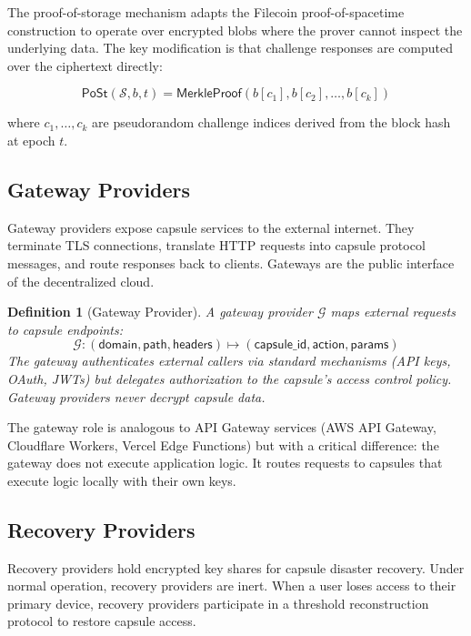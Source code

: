 \documentclass[11pt,a4paper]{article}
\newtheorem{definition}{Definition}
\begin{document}
The proof-of-storage mechanism adapts the Filecoin proof-of-spacetime
construction \cite{benet2017filecoin} to operate over encrypted blobs where
the prover cannot inspect the underlying data. The key modification is that
challenge responses are computed over the ciphertext directly:

\begin{equation}
    \mathsf{PoSt}(\mathcal{S}, b, t) = \mathsf{MerkleProof}(b[c_1], b[c_2], \ldots, b[c_k])
\end{equation}

where $c_1, \ldots, c_k$ are pseudorandom challenge indices derived from the
block hash at epoch $t$.

\subsection{Gateway Providers}

Gateway providers expose capsule services to the external internet. They
terminate TLS connections, translate HTTP requests into capsule protocol
messages, and route responses back to clients. Gateways are the public
interface of the decentralized cloud.

\begin{definition}[Gateway Provider]
A gateway provider $\mathcal{G}$ maps external requests to capsule endpoints:
\begin{equation}
    \mathcal{G}: (\mathsf{domain}, \mathsf{path}, \mathsf{headers}) \mapsto (\mathsf{capsule\_id}, \mathsf{action}, \mathsf{params})
\end{equation}
The gateway authenticates external callers via standard mechanisms (API keys,
OAuth, JWTs) but delegates authorization to the capsule's access control
policy. Gateway providers never decrypt capsule data.
\end{definition}

The gateway role is analogous to API Gateway services (AWS API Gateway,
Cloudflare Workers, Vercel Edge Functions) but with a critical difference:
the gateway does not execute application logic. It routes requests to
capsules that execute logic locally with their own keys.

\subsection{Recovery Providers}

Recovery providers hold encrypted key shares for capsule disaster recovery.
Under normal operation, recovery providers are inert. When a user loses
access to their primary device, recovery providers participate in a
threshold reconstruction protocol to restore capsule access.
\end{document}
